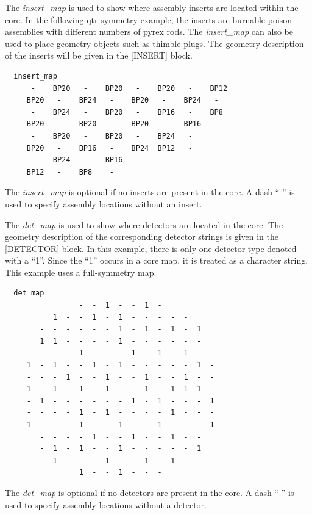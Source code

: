 The {\it insert\_map} is used to show where assembly inserts are located within the core.
In the following qtr-symmetry example,
the inserts are burnable poison assemblies with different numbers of pyrex rods.
The {\it insert\_map} can also be used to place geometry objects such as thimble plugs.
The geometry description of the inserts will be given in the [INSERT] block.
\vfill   %
\begin{verbatim}
  insert_map
      -    BP20   -    BP20   -    BP20   -    BP12
     BP20   -    BP24   -    BP20   -    BP24   -
      -    BP24   -    BP20   -    BP16   -    BP8
     BP20   -    BP20   -    BP20   -    BP16   -
      -    BP20   -    BP20   -    BP24   -
     BP20   -    BP16   -    BP24  BP12   -
      -    BP24   -    BP16   -     -
     BP12   -    BP8    -
\end{verbatim}
The {\it insert\_map} is optional if no inserts are present in the core.
A dash ``-'' is used to specify assembly locations without an insert.

The {\it det\_map} is used to show where detectors are located in the core.  The geometry description
of the corresponding detector strings is given in the [DETECTOR] block.  In this example,
there is only one detector type denoted with a ``1''.  Since the ``1'' occurs in a core map,
it is treated as a character string.  This example uses a full-symmetry map.
\begin{verbatim}
  det_map
                 -  -  1  -  -  1  -
           1  -  -  1  -  1  -  -  -  -  -
        -  -  -  -  -  -  1  -  1  -  1  -  1
        1  1  -  -  -  -  1  -  -  -  -  -  -
     -  -  -  -  1  -  -  -  1  -  1  -  1  -  -
     1  -  1  -  -  1  -  1  -  -  -  -  -  1  -
     -  -  -  1  -  -  1  -  -  1  -  -  1  -  -
     1  -  1  -  1  -  1  -  -  1  -  1  1  1  -
     -  1  -  -  -  -  -  -  1  -  1  -  -  -  1
     -  -  -  -  1  -  1  -  -  -  -  1  -  -  -
     1  -  -  -  1  -  -  1  -  -  1  -  -  -  1
        -  -  -  -  1  -  -  1  -  -  1  -  -
        -  1  -  1  -  -  1  -  -  -  -  -  1
           1  -  -  -  1  -  -  1  -  1  -
                 1  -  -  1  -  -  -
\end{verbatim}
The {\it det\_map} is optional if no detectors are present in the core.
A dash ``-'' is used to specify assembly locations without a detector.


